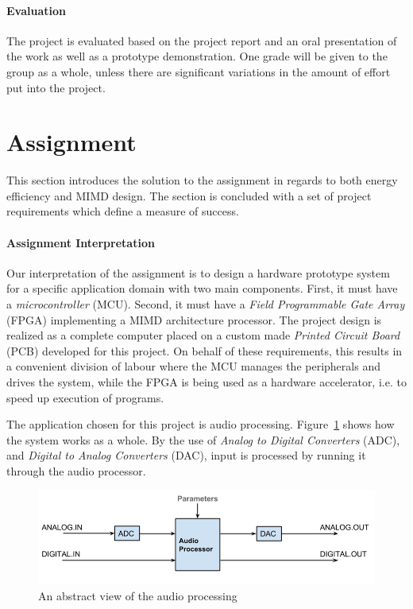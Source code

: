\paragraph{Evaluation}
The project is evaluated based on the project report and an oral presentation of
the work as well as a prototype demonstration. One grade will be given to the
group as a whole, unless there are significant variations in the amount of
effort put into the project.

\section{Assignment}

This section introduces the solution to the assignment in regards to both energy
efficiency and MIMD design. The section is concluded with a set of project
requirements which define a measure of success.

\paragraph{Assignment Interpretation}\label{intro:our-assignment-interpretation}
Our interpretation of the assignment is to design a hardware prototype system
for a specific application domain with two main components. First, it must have
a \textit{microcontroller} (MCU). Second, it must have a \textit{Field
Programmable Gate Array} (FPGA) implementing a MIMD architecture processor. The
project design is realized as a complete computer placed on a custom made
\textit{Printed Circuit Board} (PCB) developed for this project. On behalf of
these requirements, this results in a convenient division of labour where the
MCU manages the peripherals and drives the system, while the FPGA is being used
as a hardware accelerator, i.e. to speed up execution of programs.

The application chosen for this project is audio processing.
Figure~\ref{fig:audio_path_overview} shows how the system works as a whole. By
the use of \textit{Analog to Digital Converters} (ADC), and \textit{Digital to
Analog Converters} (DAC), input is processed by running it through the audio
processor.

\begin{figure}[H]
    \centering
    \includegraphics[scale=0.4]{figures/intro/intro_audio_analog_digital.png}
    \caption{An abstract view of the audio processing}
    \label{fig:audio_path_overview}
\end{figure}

